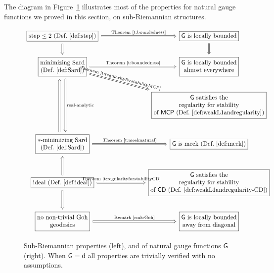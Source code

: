 \documentclass[11pt,a4paper]{article}
\theoremstyle{plain}
\theoremstyle{definition}
\theoremstyle{remark}
\numberwithin{equation}{section}
\newcommand{\CD}{\mathsf{CD}}
\newcommand{\MCP}{\mathsf{MCP}}
\newcommand{\sfd}{\mathsf d}
\newcommand{\sfG}{\mathsf G}
\begin{document}
The diagram in Figure~\ref{fig:implications} illustrates most of the properties for natural gauge functions we proved in this section, on sub-Riemannian structures.
\begin{figure}[t]
\[
\begin{tikzcd}[arrows=Rightarrow]
\fbox{\text{step $\leq 2$ (Def.\ \ref{def:step})}} \arrow[d] \arrow[rrr, "\text{Theorem \ref{t:boundedness}}"] & & & \fbox{$\sfG$ \text{is locally bounded}} \arrow[d] \\
\fbox{\begin{tabular}{@{}c@{}}minimizing Sard \\ (Def.\ \ref{def:Sard})\end{tabular}} \arrow[rrrd, "\text{Theorem \ref{t:regularityforstabilityMCP}}", sloped] \arrow[rrr, "\text{Theorem \ref{t:boundedness}}"] \arrow[dd, "\text{real-analytic}", shift left=2] & & &
\fbox{\begin{tabular}{@{}c@{}} $\sfG$ is locally bounded\\ almost everywhere \end{tabular}}\\
& & & \fbox{\begin{tabular}{@{}c@{}}$\sfG$ satisfies the\\ regularity for stability\\ of $\MCP$ (Def.\ \ref{def:weakL1andregularity})\end{tabular}} \\
\fbox{\begin{tabular}{@{}c@{}} $*$-minimizing Sard \\ (Def.\ \ref{def:Sard})\end{tabular}} \arrow[uu, shift left=2] \arrow[rrr, "\text{Theorem \ref{t:meeknatural}}"] & & & \fbox{$\sfG$ is meek (Def.\ \ref{def:meek})}\\
\fbox{\text{ideal (Def.\ \ref{def:ideal})}} \arrow[u] \arrow[d] \arrow[rrr, "\text{Theorem \ref{t:regularityforstabilityCD}}"] & & & 
\fbox{\begin{tabular}{@{}c@{}}$\sfG$ satisfies the \\ regularity for stability \\ of $\CD$   (Def.\ \ref{def:weakL1andregularity-CD})\end{tabular}} \\
\fbox{\begin{tabular}{@{}c@{}}no non-trivial Goh \\ geodesics \end{tabular}} \arrow[rrr, "\text{Remark \ref{rmk:Goh}}"] & & &
\fbox{\begin{tabular}{@{}c@{}}$\sfG$ is locally bounded\\ away from diagonal\end{tabular}}
\end{tikzcd}
\]
\caption{Sub-Riemannian properties (left), and of natural gauge functions $\sfG$ (right). When $\sfG=\sfd$ all properties are trivially verified with no assumptions.}\label{fig:implications}
\end{figure}
\end{document}

